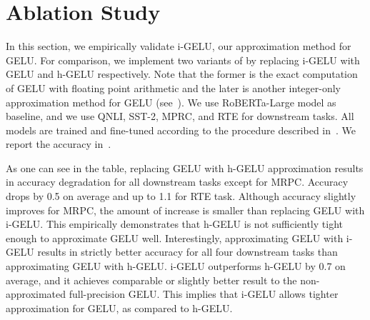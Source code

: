 

\section{\textbf{Ablation Study}}
\label{sec:ablation_study}


In this section, we empirically validate i-GELU, our approximation method for GELU. 
For comparison, we implement two variants of \OURS by replacing i-GELU with GELU and h-GELU respectively.
Note that the former is the exact computation of GELU with floating point arithmetic 
and the later is another integer-only approximation method for GELU (see~).
We use RoBERTa-Large model as baseline, and we use QNLI, SST-2, MPRC, and RTE for downstream tasks. 
All models are trained and fine-tuned according to the procedure described in~.
We report the accuracy in~.

As one can see in the table, replacing GELU with h-GELU approximation results in accuracy degradation for all downstream tasks except for MRPC.
Accuracy drops by 0.5 on average and up to 1.1 for RTE task.
Although accuracy slightly improves for MRPC, the amount of increase is smaller than replacing GELU with i-GELU.
This empirically demonstrates that h-GELU is not sufficiently tight enough to approximate GELU well.
Interestingly, approximating GELU with i-GELU results in strictly better accuracy for all four downstream tasks than approximating GELU with h-GELU.
i-GELU outperforms h-GELU by 0.7 on average, and it achieves comparable or slightly better result to the non-approximated full-precision GELU. 
This implies that i-GELU allows tighter approximation for GELU, as compared to h-GELU.

\begin{table}[!t]
\caption{ 
Accuracy of models that use GELU, h-GELU and i-GELU for GELU computation. Note that the former is the full-precision, floating point computation while the latter two are the integer-only approximations. 
}

\vskip 0.1in
\label{tab:gelu_comparison}
    \centering
    \small{
    }
\end{table}
